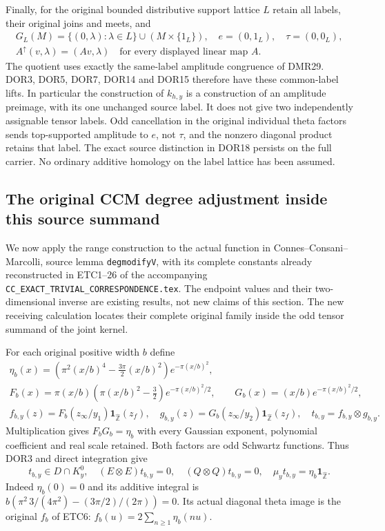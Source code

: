 Finally, for the original bounded distributive support lattice $L$
retain all labels, their original joins and meets, and
\begin{equation}\tag{DOR19}
\begin{gathered}
G_L(M)=\{(0,\lambda):\lambda\in L\}\cup(M\times\{1_L\}),
\quad e=(0,1_L),\quad\tau=(0,0_L),\\
A^\uparrow(v,\lambda)=(Av,\lambda)
\quad\text{for every displayed linear map }A.
\end{gathered}
\end{equation}
The quotient uses exactly the same-label amplitude congruence
of DMR29. DOR3, DOR5, DOR7, DOR14 and DOR15 therefore have
these common-label lifts. In particular the construction of
$k_{h,y}$ is a construction of an amplitude preimage, with its
one unchanged source label. It does not give two independently
assignable tensor labels. Odd cancellation in the original
individual theta factors sends top-supported amplitude to $e$,
not $\tau$, and the nonzero diagonal product retains that label.
The exact source distinction in DOR18 persists on the full
carrier. No ordinary additive homology on the label lattice
has been assumed.

\subsection{The original CCM degree adjustment inside this source summand}

We now apply the range construction to the actual function in
Connes--Consani--Marcolli, source lemma \texttt{degmodifyV}, with its
complete constants already reconstructed in ETC1--26 of the accompanying
\nolinkurl{CC_EXACT_TRIVIAL_CORRESPONDENCE.tex}. The endpoint values
and their two-dimensional inverse are existing results, not new claims
of this section. The new receiving calculation locates their complete
original family inside the odd tensor summand of the joint kernel.

For each original positive width $b$ define
\begin{equation}\tag{DOR20}
\begin{gathered}
\eta_b(x)=
\left(\pi^2(x/b)^4-\frac{3\pi}{2}(x/b)^2\right)e^{-\pi(x/b)^2},\\
F_b(x)=\pi(x/b)\left(\pi(x/b)^2-\frac32\right)
                  e^{-\pi(x/b)^2/2},\qquad
G_b(x)=(x/b)e^{-\pi(x/b)^2/2},\\
f_{b,y}(z)=F_b(z_\infty/y_1)\mathbf1_{\widehat{\mathbb Z}}(z_f),
\quad
g_{b,y}(z)=G_b(z_\infty/y_2)\mathbf1_{\widehat{\mathbb Z}}(z_f),
\quad t_{b,y}=f_{b,y}\otimes g_{b,y}.
\end{gathered}
\end{equation}
Multiplication gives $F_bG_b=\eta_b$ with every Gaussian exponent,
polynomial coefficient and real scale retained. Both factors are odd
Schwartz functions. Thus DOR3 and direct integration give
\[
t_{b,y}\in D\cap K_y^0,\quad (E\otimes E)t_{b,y}=0,\quad
(Q\otimes Q)t_{b,y}=0,\quad
\mu_y t_{b,y}=\eta_b\mathbf1_{\widehat{\mathbb Z}}.
\]
Indeed $\eta_b(0)=0$ and its additive integral is
$b(\pi^2\,3/(4\pi^2)-(3\pi/2)/(2\pi))=0$.
Its actual diagonal theta image is the original $f_b$ of ETC6:
$f_b(u)=2\sum_{n\ge1}\eta_b(nu)$.


